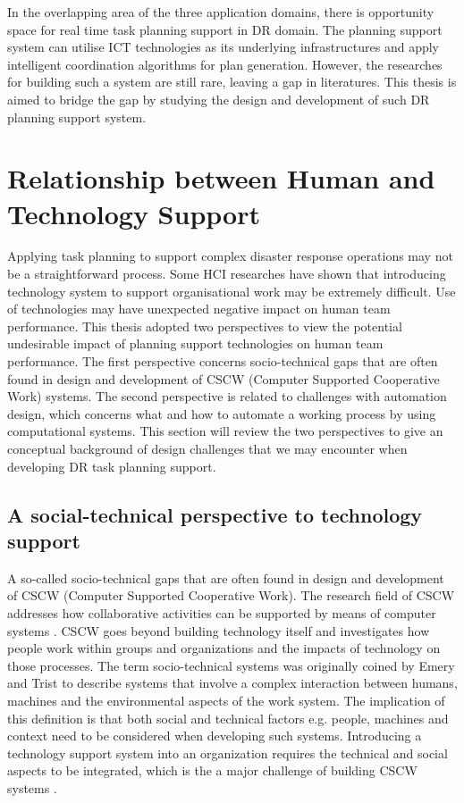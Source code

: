 In the overlapping area of the three application domains, there is opportunity space for real time task planning support in DR domain. The planning support system can utilise ICT technologies as its underlying infrastructures and apply intelligent coordination algorithms for plan generation. However, the researches for building such a system are still rare, leaving a gap in literatures. This thesis is aimed to bridge the gap by studying the design and development of such DR planning support system.\\

\section{Relationship between Human and Technology Support}\label{sec:LRSocialTechnical}
Applying task planning to support complex disaster response operations may not be a straightforward process. Some HCI researches \cite{Ackerman2000,Bowers1994,Niazkhani2009} have shown that introducing technology system to support organisational work may be extremely difficult. Use of technologies may have unexpected negative impact on human team performance. This thesis adopted two perspectives to view the potential undesirable impact of planning support technologies on human team performance. The first perspective concerns socio-technical gaps that are often found in design and development of CSCW (Computer Supported Cooperative Work) systems. The second perspective is related to challenges with automation design, which concerns what and how to automate a working process by using computational systems. This section will review the two perspectives to give an conceptual background of design challenges that we may encounter when developing DR task planning support.\\


\subsection{A social-technical perspective to technology support}
A so-called socio-technical gaps that are often found in design and development of CSCW (Computer Supported Cooperative Work). The research field of CSCW addresses how collaborative activities can be supported by means of computer systems \cite{Carstensen1999}.  CSCW goes beyond building technology itself and investigates how people work within groups and organizations and the impacts of technology on those processes. The term socio-technical systems was originally coined by Emery and Trist \cite{Ropohl1999} to describe systems that involve a complex interaction between humans, machines and the environmental aspects of the work system. The implication of this definition is that both social and technical factors e.g. people, machines and context need to be considered when developing such systems. Introducing a technology support system into an organization requires the technical and social aspects to be integrated, which is the a major challenge of building CSCW systems \cite{Ackerman2000}. \\


